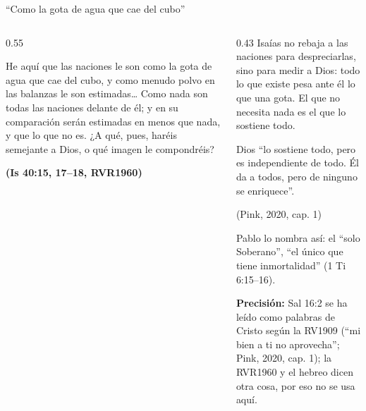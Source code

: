 \documentclass[hyperref={bookmarks=false},aspectratio=169]{beamer}
\newcommand{\fuente}[1]{\par\hfill{\upshape\bfseries\footnotesize\textcolor{azul}{#1}}}
\newcommand{\precision}[1]{{\footnotesize\color{gris}\textbf{Precisión:} #1}}
\begin{document}
\begin{frame}{``Como la gota de agua que cae del cubo''}
\begin{columns}[c,onlytextwidth]
\begin{column}{0.55\textwidth}
\begin{cita}He aquí que las naciones le son como la gota de agua que cae del cubo, y como menudo polvo en las balanzas le son estimadas\ldots{} Como nada son todas las naciones delante de él; y en su comparación serán estimadas en menos que nada, y que lo que no es. ¿A qué, pues, haréis semejante a Dios, o qué imagen le compondréis?\fuente{(Is 40:15, 17--18, RVR1960)}\end{cita}
\end{column}
\begin{column}{0.43\textwidth}
\scriptsize Isaías no rebaja a las naciones para despreciarlas, sino para medir a Dios: todo lo que existe pesa ante él lo que una gota. El que no necesita nada es el que lo sostiene todo.\par\smallskip
\begin{tcolorbox}[colback=azul,colframe=dorado,boxrule=1.2pt,arc=3pt,coltext=papiro]
\centering\small Dios ``lo sostiene todo, pero es independiente de todo. Él da a todos, pero de ninguno se enriquece''.\par{\scriptsize(Pink, 2020, cap. 1)}
\end{tcolorbox}
\scriptsize Pablo lo nombra así: el ``solo Soberano'', ``el único que tiene inmortalidad'' (1 Ti 6:15--16).\par\smallskip
\precision{Sal 16:2 se ha leído como palabras de Cristo según la RV1909 (``mi bien a ti no aprovecha''; Pink, 2020, cap. 1); la RVR1960 y el hebreo dicen otra cosa, por eso no se usa aquí.}
\end{column}
\end{columns}
\end{frame}
\end{document}
